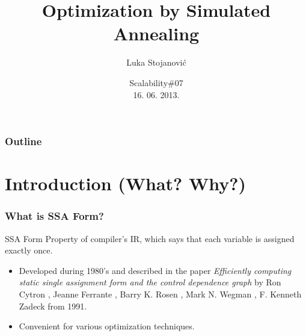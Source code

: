 \documentclass{beamer}
\title{Optimization by Simulated Annealing}
\author{Luka Stojanović}
\institute{
  luka@magrathea.rs \\
  Seven Bridges Genomics
}
\date{Scalability\#07 \\ 16. 06. 2013.}
\begin{document}
  \begin{frame}
    \titlepage
  \end{frame}
  
  \begin{frame}
    \frametitle{Outline}
    \tableofcontents
  \end{frame}
  
  \section{Introduction (What? Why?)}
  \begin{frame}
    \frametitle{What is SSA Form?}
    \begin{block}{SSA Form}
    	Property of compiler's IR, which says that each variable is assigned exactly once.
    \end{block}
    
    \begin{itemize}
    	\item Developed during 1980's and described in the paper
    \emph{Efficiently computing static single assignment form and the control dependence graph}
    by Ron Cytron , Jeanne Ferrante , Barry K. Rosen , Mark N. Wegman , F. Kenneth Zadeck from 1991.
    	\item Convenient for various optimization techniques.
    \end{itemize}
    
  \end{frame}
  
\end{document}
